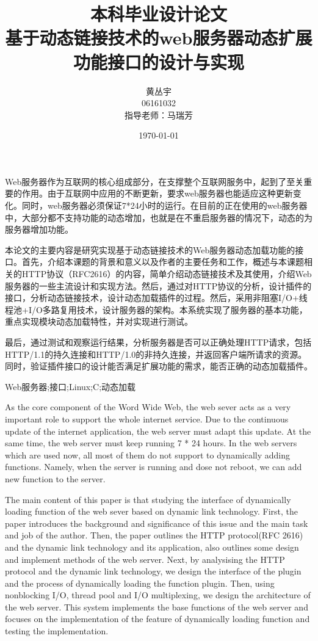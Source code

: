 \documentclass[twoside, xetex]{report}
\begin{document}
\title{{\Huge 本科毕业设计论文\\}基于动态链接技术的web服务器动态扩展功能接口的设计与实现}
\author{黄丛宇\\06161032\\指导老师：马瑞芳}
\date{\today}

\lfour

\zhabstract 

Web服务器作为互联网的核心组成部分，在支撑整个互联网服务中，起到了至关重要的作用。由于互联网中应用的不断更新，要求web服务器也能适应这种更新变化。同时，web服务器必须保证7*24小时的运行。在目前的正在使用的web服务器中，大部分都不支持功能的动态增加，也就是在不重启服务器的情况下，动态的为服务器增加功能。

本论文的主要内容是研究实现基于动态链接技术的Web服务器动态加载功能的接口。首先，介绍本课题的背景和意义以及作者的主要任务和工作，概述与本课题相关的HTTP协议（RFC2616）的内容，简单介绍动态链接技术及其使用，介绍Web服务器的一些主流设计和实现方法。然后，通过对HTTP协议的分析，设计插件的接口，分析动态链接技术，设计动态加载插件的过程。然后，采用非阻塞I/O+线程池+I/O多路复用技术，设计服务器的架构。本系统实现了服务器的基本功能，重点实现模块动态加载特性，并对实现进行测试。

最后，通过测试和观察运行结果，分析服务器是否可以正确处理HTTP请求，包括HTTP/1.1的持久连接和HTTP/1.0的非持久连接，并返回客户端所请求的资源。同时，验证插件接口的设计能否满足扩展功能的需求，能否正确的动态加载插件。

{\zhkeywords Web服务器;接口;Linux;C;动态加载}

\enabstract
	As the core component of the Word Wide Web, the web sever acts as a very important role to support the whole internet service. Due to the continuous update of the internet application, the web server must adapt this update. At the same time, the web server must keep running 7 * 24 hours. In the web servers which are used now, all most of them do not support to dynamically adding functions. Namely, when the server is running and dose not reboot, we can add new function to the server. 
	
	The main content of this paper is that studying the interface of dynamically loading function of the web sever based on dynamic link technology. First, the paper introduces the background and significance of this issue and the main task and job of the author. Then, the paper outlines the HTTP protocol(RFC 2616) and the dynamic link technology and its application, also outlines some design and implement methods of the web server. Next, by analysising the HTTP protocol and the dynamic link technology, we design the interface of the plugin and the process of dynamically loading the function plugin. Then, using nonblocking I/O, thread pool and I/O multiplexing, we design the architecture of the web server. This system implements the base functions of the web server and focuses on the implementation of the feature of dynamically loading function and testing the implementation.
	
\end{document}
